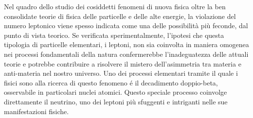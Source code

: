 
Nel quadro dello studio dei cosiddetti fenomeni di nuova fisica oltre la ben consolidate
teorie di fisica delle particelle e delle alte energie, la violazione del numero leptonico
viene spesso indicata come una delle possibilit\`a pi\`u feconde, dal punto di vista
teorico. Se verificata sperimentalmente, l'ipotesi che questa tipologia di particelle
elementari, i leptoni, non sia coinvolta in maniera omogenea nei processi fondamentali della
natura confermerebbe l'inadeguatezza delle attuali teorie e potrebbe contribuire a
risolvere il mistero dell'asimmetria tra materia e anti-materia nel nostro universo. Uno
dei processi elementari tramite il quale i fisici sono alla ricerca di questo fenomeno \'e il
decadimento doppio-beta, osservabile in particolari nuclei atomici. Questo speciale
processo coinvolge direttamente il neutrino, uno dei leptoni pi\`u sfuggenti e intriganti
nelle sue manifestazioni fisiche.

